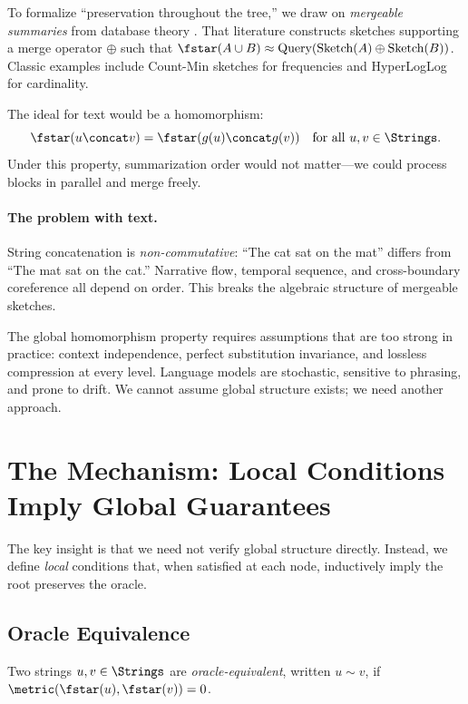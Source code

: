 To formalize ``preservation throughout the tree,'' we draw on \emph{mergeable summaries} from database theory \citep{agarwal2013mergeable}. That literature constructs sketches supporting a merge operator $\oplus$ such that $\fstar(A \cup B) \approx \text{Query}(\text{Sketch}(A) \oplus \text{Sketch}(B))$. Classic examples include Count-Min sketches for frequencies and HyperLogLog for cardinality.

The ideal for text would be a homomorphism:
\[
\fstar(u \concat v) = \fstar(g(u) \concat g(v)) \quad \text{for all } u, v \in \Strings.
\]
Under this property, summarization order would not matter---we could process blocks in parallel and merge freely.

\paragraph{The problem with text.}
String concatenation is \emph{non-commutative}: ``The cat sat on the mat'' differs from ``The mat sat on the cat.'' Narrative flow, temporal sequence, and cross-boundary coreference all depend on order. This breaks the algebraic structure of mergeable sketches.

The global homomorphism property requires assumptions that are too strong in practice: context independence, perfect substitution invariance, and lossless compression at every level. Language models are stochastic, sensitive to phrasing, and prone to drift. We cannot assume global structure exists; we need another approach.

\section{The Mechanism: Local Conditions Imply Global Guarantees}\label{sec:mechanism}

The key insight is that we need not verify global structure directly. Instead, we define \emph{local} conditions that, when satisfied at each node, inductively imply the root preserves the oracle.

\subsection{Oracle Equivalence}

\begin{definition}\label{def:oracle-equiv}
Two strings $u, v \in \Strings$ are \emph{oracle-equivalent}, written $u \sim v$, if $\metric(\fstar(u), \fstar(v)) = 0$.
\end{definition}

